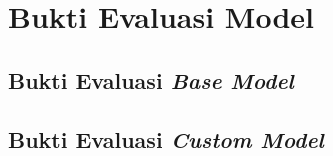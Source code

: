 \chapter{Bukti Evaluasi Model}

\section{Bukti Evaluasi \emph{Base Model}}
\subsection{}

\section{Bukti Evaluasi \emph{Custom Model}}
